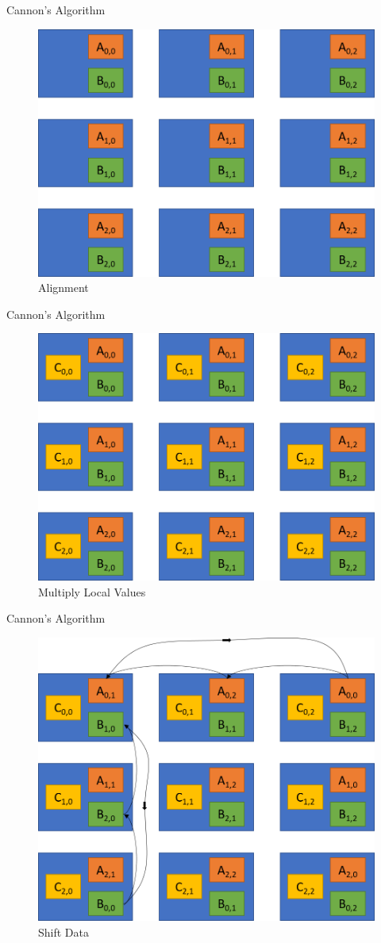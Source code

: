 \documentclass[10pt]{beamer}
\begin{document}
\begin{frame}{Cannon's Algorithm}
	\begin{figure}	
		\centering
		\includegraphics[width=0.72\linewidth]{figures/step_1_cannon.png}
		\caption{Alignment}
	\end{figure}
\end{frame}

\begin{frame}{Cannon's Algorithm}
	\begin{figure}	
		\centering
		\includegraphics[width=0.72\linewidth]{figures/step_2_cannon.png}
		\caption{Multiply Local Values}
	\end{figure}
\end{frame}

\begin{frame}{Cannon's Algorithm}
\begin{figure}	
	\centering
	\includegraphics[width=0.72\linewidth]{figures/step_3_cannon.png}
	\caption{Shift Data}
\end{figure}
\end{frame}
\end{document}
